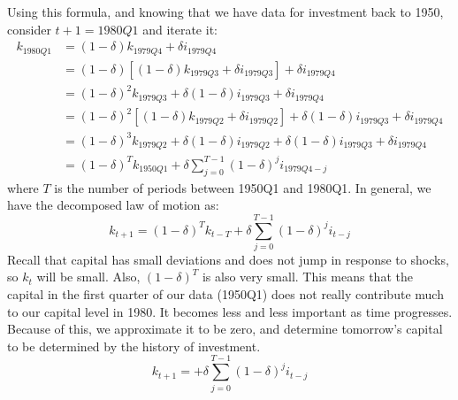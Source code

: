 \documentclass[12pt,oneside,reqno]{amsart}
\begin{document}
Using this formula, and knowing that we have data for investment back to 1950, consider $t+1=1980Q1$ and iterate it:
\begin{align*}
k_{1980Q1} & = (1-\delta)k_{1979Q4}+\delta i_{1979Q4}
\\
& = (1-\delta)[(1-\delta)k_{1979Q3} +\delta i_{1979Q3}
    ]+\delta i_{1979Q4}
    \\
& = (1-\delta)^2k_{1979Q3} +\delta (1-\delta)i_{1979Q3}
    +\delta i_{1979Q4} 
    \\
& = (1-\delta)^2[(1-\delta)k_{1979Q2} +\delta 
    i_{1979Q2}]
    +\delta (1-\delta)i_{1979Q3}
    +\delta i_{1979Q4} 
    \\
& = (1-\delta)^3k_{1979Q2} +\delta (1-\delta)i_{1979Q2}
    +\delta (1-\delta)i_{1979Q3}
    +\delta i_{1979Q4} 
    \\
& = (1-\delta)^Tk_{1950Q1} 
    + \delta\sum_{j = 0}^{T-1}(1-\delta)^j i_{1979Q4-j}
\end{align*}
where $T$ is the number of periods between 1950Q1 and 1980Q1. In general, we have the decomposed law of motion as:
\[k_{t+1} = (1-\delta)^Tk_{t-T} 
    + \delta\sum_{j = 0}^{T-1}(1-\delta)^j i_{t-j} \]
Recall that capital has small deviations and does not jump in response to shocks, so $k_t$ will be small. Also, $(1-\delta)^T$ is also very small. This means that the capital in the first quarter of our data (1950Q1) does not really contribute much to our capital level in 1980. It becomes less and less important as time progresses. Because of this, we approximate it to be zero, and determine tomorrow's capital to be determined by the history of investment.
\[k_{t+1} = 
    + \delta\sum_{j = 0}^{T-1}(1-\delta)^j i_{t-j} \]


\pagebreak
\end{document}
